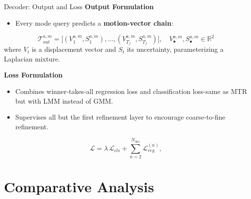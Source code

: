 \documentclass[10pt,aspectratio=169]{beamer}
\begin{document}
\begin{frame}{Decoder: Output and Loss}
    \textbf{Output Formulation}
    \begin{itemize}
        \item Every mode query predicts a \textbf{motion-vector chain}:
    \end{itemize}
    \begin{equation}
    \mathcal{T}_{out}^{a,m} = \bigl[(V_1^{a,m},S_1^{a,m}),\dots,(V_{T_f}^{a,m},S_{T_f}^{a,m})\bigr], \quad V_\bullet^{a,m}, S_\bullet^{a,m} \in \mathbb{R}^2
    \end{equation}
    where \(V_t\) is a displacement vector and \(S_t\) its uncertainty, parameterizing a Laplacian mixture.

    \vspace{1em}
    \textbf{Loss Formulation}
    \begin{itemize}
        \item Combines winner-takes-all regression loss and classification loss-same as MTR but with LMM instead of GMM.
        \item Supervises all but the first refinement layer to encourage coarse-to-fine refinement.
    \end{itemize}

    \begin{equation}
    \mathcal{L}
    = \lambda\,\mathcal{L}_{cls}
        + \sum_{n=2}^{N_{\text{dec}}}\mathcal{L}_{reg}^{(n)},
    \label{eq:lm_loss}
    \end{equation}
\end{frame}



\section{Comparative Analysis}
\end{document}
